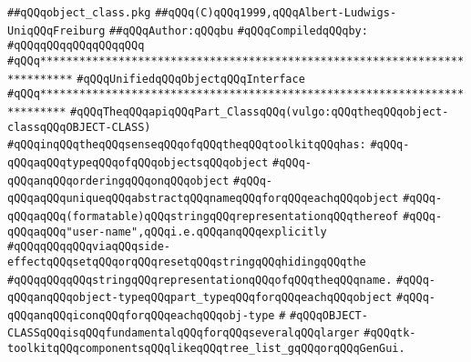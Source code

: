 \label{src/lib/tk/src/toolkit/object_class.api}
\verb|##qQQqobject_class.pkg|\newline
\verb|##qQQq(C)qQQq1999,qQQqAlbert-Ludwigs-UniqQQqFreiburg|\newline
\verb|##qQQqAuthor:qQQqbu|\newline
\newline
\verb|#qQQqCompiledqQQqby:|\newline
\verb|#qQQqqQQqqQQqqQQqqQQq|\newline
\newline
\newline
\verb|#qQQq***************************************************************************|\newline
\verb|#qQQqUnifiedqQQqObjectqQQqInterface|\newline
\verb|#qQQq**************************************************************************|\newline
\newline
\verb|#qQQqTheqQQqapiqQQqPart_ClassqQQq(vulgo:qQQqtheqQQqobject-classqQQqOBJECT-CLASS)|\newline
\verb|#qQQqinqQQqtheqQQqsenseqQQqofqQQqtheqQQqtoolkitqQQqhas:|\newline
\verb|#qQQq-qQQqaqQQqtypeqQQqofqQQqobjectsqQQqobject|\newline
\verb|#qQQq-qQQqanqQQqorderingqQQqonqQQqobject|\newline
\verb|#qQQq-qQQqaqQQquniqueqQQqabstractqQQqnameqQQqforqQQqeachqQQqobject|\newline
\verb|#qQQq-qQQqaqQQq(formatable)qQQqstringqQQqrepresentationqQQqthereof|\newline
\verb|#qQQq-qQQqaqQQq"user-name",qQQqi.e.qQQqanqQQqexplicitly|\newline
\verb|#qQQqqQQqqQQqviaqQQqside-effectqQQqsetqQQqorqQQqresetqQQqstringqQQqhidingqQQqthe|\newline
\verb|#qQQqqQQqqQQqstringqQQqrepresentationqQQqofqQQqtheqQQqname.|\newline
\verb|#qQQq-qQQqanqQQqobject-typeqQQqpart_typeqQQqforqQQqeachqQQqobject|\newline
\verb|#qQQq-qQQqanqQQqiconqQQqforqQQqeachqQQqobj-type|\newline
\verb|#|\newline
\verb|#qQQqOBJECT-CLASSqQQqisqQQqfundamentalqQQqforqQQqseveralqQQqlarger|\newline
\verb|#qQQqtk-toolkitqQQqcomponentsqQQqlikeqQQqtree_list_gqQQqorqQQqGenGui.|\newline
